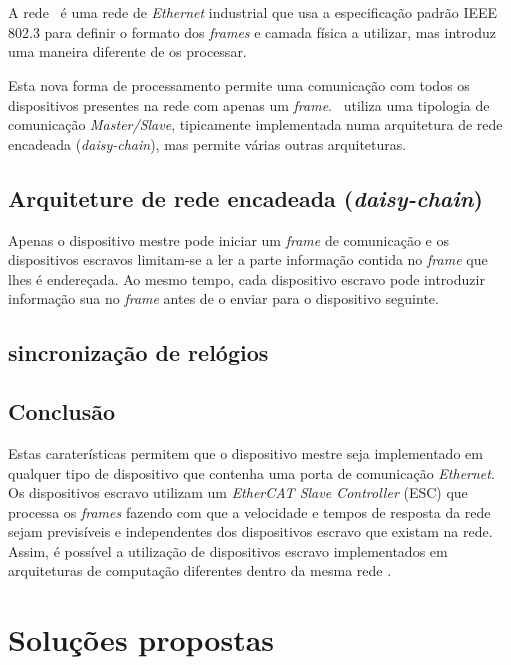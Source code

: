 \section{\ecat}\label{sec:ethercat}

A rede \ecat\ é uma rede de \emph{Ethernet} industrial que usa a
especificação padrão IEEE 802.3 \cite[]{ieee:IEEEStandardEthernet} para
definir o formato dos \emph{frames} e camada física a utilizar, mas
introduz uma maneira diferente de os processar.

Esta nova forma de processamento permite uma comunicação com todos os
dispositivos presentes na rede com apenas um \emph{frame}. \ecat\ utiliza
uma tipologia de comunicação \emph{Master/Slave}, tipicamente implementada
numa arquitetura de rede encadeada (\emph{daisy-chain}), mas permite várias
outras arquiteturas.

\subsection{Arquiteture de rede encadeada (\emph{daisy-chain})}
\label{sec:daisychain}
Apenas o dispositivo mestre pode iniciar um \emph{frame} de comunicação
e os dispositivos escravos limitam-se a ler a parte informação contida
no \emph{frame} que lhes é endereçada. Ao mesmo tempo, cada dispositivo
escravo pode introduzir informação sua  no \emph{frame} antes de o enviar
para o dispositivo seguinte.

\subsection{sincronização de relógios}

\subsection{Conclusão}
Estas caraterísticas permitem que o dispositivo mestre seja implementado
em qualquer tipo de dispositivo que contenha uma porta de comunicação 
\emph{Ethernet}. Os dispositivos escravo utilizam um \emph{EtherCAT Slave
Controller} (ESC) que processa os \emph{frames} fazendo com que a velocidade
e tempos de resposta da rede sejam previsíveis e independentes dos 
dispositivos escravo que existam na rede. Assim, é possível a utilização
de dispositivos escravo implementados em arquiteturas de computação
diferentes dentro da mesma rede \ecat.


\section{Soluções propostas} \label{sec:solution}

